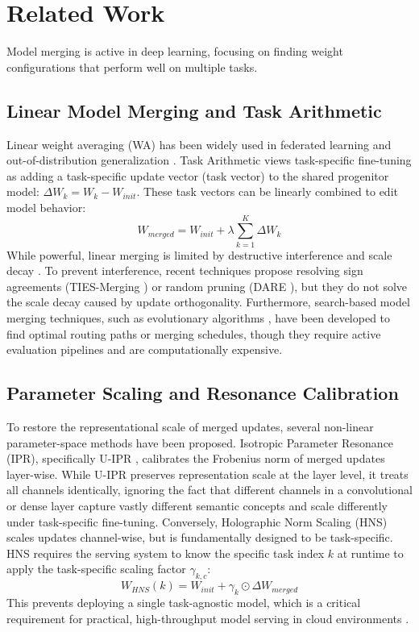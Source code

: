 \documentclass{article}
\theoremstyle{plain}
\theoremstyle{definition}
\theoremstyle{remark}
\begin{document}
\section{Related Work}
\label{submission3:sec:related_work}

Model merging is active in deep learning, focusing on finding weight configurations that perform well on multiple tasks.

\subsection{Linear Model Merging and Task Arithmetic}
Linear weight averaging (WA) has been widely used in federated learning \cite{mcmahan2017communication} and out-of-distribution generalization \cite{izmailov2018averaging, wortsman2022robust}.
Task Arithmetic \cite{ilharco2022editing} views task-specific fine-tuning as adding a task-specific update vector (task vector) to the shared progenitor model: $\Delta W_k = W_k - W_{init}$.
These task vectors can be linearly combined to edit model behavior:
\begin{equation}
    W_{merged} = W_{init} + \lambda \sum_{k=1}^K \Delta W_k
\end{equation}
While powerful, linear merging is limited by destructive interference and scale decay \cite{yadav2023ties, orthogonal_collapse}.
To prevent interference, recent techniques propose resolving sign agreements (TIES-Merging \cite{yadav2023ties}) or random pruning (DARE \cite{yu2023language}), but they do not solve the scale decay caused by update orthogonality.
Furthermore, search-based model merging techniques, such as evolutionary algorithms \cite{akiba2024evolutionary}, have been developed to find optimal routing paths or merging schedules, though they require active evaluation pipelines and are computationally expensive.

\subsection{Parameter Scaling and Resonance Calibration}
To restore the representational scale of merged updates, several non-linear parameter-space methods have been proposed.
Isotropic Parameter Resonance (IPR), specifically U-IPR \cite{submission9_reference}, calibrates the Frobenius norm of merged updates layer-wise.
While U-IPR preserves representation scale at the layer level, it treats all channels identically, ignoring the fact that different channels in a convolutional or dense layer capture vastly different semantic concepts and scale differently under task-specific fine-tuning.
Conversely, Holographic Norm Scaling (HNS) \cite{submission7_reference} scales updates channel-wise, but is fundamentally designed to be task-specific.
HNS requires the serving system to know the specific task index $k$ at runtime to apply the task-specific scaling factor $\gamma_{k, c}$:
\begin{equation}
    W_{HNS}(k) = W_{init} + \gamma_{k} \odot \Delta W_{merged}
\end{equation}
This prevents deploying a single task-agnostic model, which is a critical requirement for practical, high-throughput model serving in cloud environments \cite{multitask_serving}.
\end{document}
